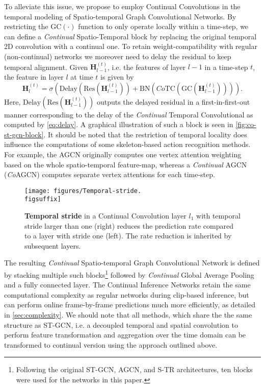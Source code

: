 \documentclass[journal]{IEEEtran}
\newcommand{\figsuffix}{png}
\theoremstyle{definition}
\begin{document}
To alleviate this issue, we propose to employ Continual Convolutions in the temporal modeling of Spatio-temporal Graph Convolutional Networks.
By restricting the $\text{GC}(\cdot)$ function to only operate locally within a time-step, we can define a \textit{Continual} Spatio-Temporal block by replacing the original temporal 2D convolution with a continual one. To retain weight-compatibility with regular (non-continual) networks we moreover need to delay the residual to keep temporal alignment.
Given $\mathbf{H}_{l-1}^{(t)}$, i.e. the features of layer $l-1$ in a time-step $t$, the feature in layer $l$ at time $t$ is given by
\begin{equation}
    \mathbf{H}_{l}^{(t)} = \sigma\left(\text{Delay}(\text{Res}(\mathbf{H}_{l-1}^{(t)})) + \text{BN}(Co\text{TC}(\text{GC}(\mathbf{H}_{l-1}^{(t)})))\right).
    \label{eq:co-spatio-temporal-block}
\end{equation}
Here, $\text{Delay}(\text{Res}(\mathbf{H}_{l-1}^{(t)}))$ outputs the delayed residual in a first-in-first-out manner corresponding to the delay of the \textit{Continual} Temporal Convolutional as computed by \cref{eq:delay}.
A graphical illustration of such a block is seen in \cref{fig:co-st-gcn-block}.
It should be noted that the restriction of temporal locality does influence the computations of some skeleton-based action recognition methods. For example, the AGCN originally computes one vertex attention weighting based on the whole spatio-temporal feature-map, whereas a \textit{Continual} AGCN (\textit{Co}AGCN) computes separate vertex attentions for each time-step.

\begin{figure}[tb]
    \centering
    \texttt{[image: figures/Temporal-stride.\\figsuffix]}
    \caption{\textbf{Temporal stride} in a Continual Convolution layer $l_1$ with temporal stride larger than one (right) reduces the prediction rate compared to a layer with stride one (left). The rate reduction is inherited by subsequent layers.}
    \label{fig:stride}
\end{figure}

The resulting \textit{Continual} Spatio-temporal Graph Convolutional Network is defined by stacking multiple such blocks\footnote{Following the original ST-GCN, AGCN, and S-TR architectures, ten blocks were used for the networks in this paper.} followed by \textit{Continual} Global Average Pooling~\cite{hedegaard2021continual} and a fully connected layer.
The Continual Inference Networks retain the same computational complexity as regular networks during clip-based inference, but can perform online frame-by-frame predictions much more efficiently, as detailed in \cref{sec:complexity}.
We should note that all methods, which share the the same structure as ST-GCN, i.e. a decoupled temporal and spatial convolution to perform feature transformation and aggregation over the time domain can be transformed to continual version using the approach outlined above.
\end{document}
